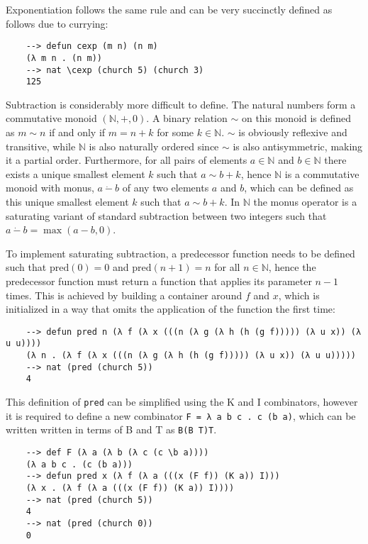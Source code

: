 Exponentiation follows the same rule and can be very succinctly defined as follows due to currying:

\begin{Verbatim}
    --> defun cexp (m n) (n m)
    (λ m n . (n m))
    --> nat \cexp (church 5) (church 3)
    125
\end{Verbatim}

Subtraction is considerably more difficult to define. The natural numbers form a commutative monoid $(\mathbb{N}, +, 0)$. A binary relation $\sim$ on this monoid is defined as $m\sim n$ if and only if $m = n + k$ for some $k \in \mathbb{N}$. $\sim$ is obviously reflexive and transitive, while $\mathbb{N}$ is also naturally ordered since $\sim$ is also antisymmetric, making it a partial order. Furthermore, for all pairs of elements $a \in \mathbb{N}$ and $b \in \mathbb{N}$ there exists a unique smallest element $k$ such that $a \sim b + k$, hence $\mathbb{N}$ is a commutative monoid with monus, $a\ \dot -\ b$ of any two elements $a$ and $b$, which can be defined as this unique smallest element $k$ such that $a \sim b + k$. In $\mathbb{N}$ the monus operator is a saturating variant of standard subtraction between two integers such that $a\ \dot -\ b = \max(a - b, 0)$. 

To implement saturating subtraction, a predecessor function needs to be defined such that $\text{pred}(0) = 0$ and $\text{pred}(n + 1) = n$ for all $n \in \mathbb{N}$, hence the predecessor function must return a function that applies its parameter $n - 1$ times. This is achieved by building a container around $f$ and $x$, which is initialized in a way that omits the application of the function the first time:

\begin{Verbatim}
    --> defun pred n (λ f (λ x (((n (λ g (λ h (h (g f))))) (λ u x)) (λ u u))))
    (λ n . (λ f (λ x (((n (λ g (λ h (h (g f))))) (λ u x)) (λ u u)))))
    --> nat (pred (church 5))
    4
\end{Verbatim}

This definition of \verb|pred| can be simplified using the K and I combinators, however it is required to define a new combinator \verb|F = λ a b c . c (b a)|, which can be written written in terms of B and T as \verb|B(B T)T|.

\begin{Verbatim}
    --> def F (λ a (λ b (λ c (c \b a))))
    (λ a b c . (c (b a)))
    --> defun pred x (λ f (λ a (((x (F f)) (K a)) I)))
    (λ x . (λ f (λ a (((x (F f)) (K a)) I))))
    --> nat (pred (church 5))
    4
    --> nat (pred (church 0))
    0
\end{Verbatim}

